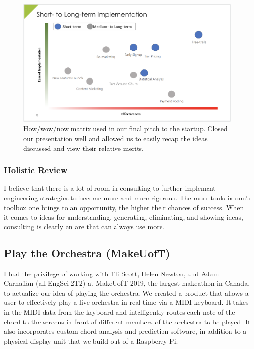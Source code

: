 \documentclass[a4paper,12pt]{article}
\begin{document}
\begin{figure}[H]
\centering
\includegraphics[width=1\textwidth]{img/image011.png}
\caption{How/wow/now matrix used in our final pitch to the startup. Closed our presentation well and allowed us to easily recap the ideas discussed and view their relative merits.}
\label{}
\end{figure}

\subsubsection{Holistic Review}
I believe that there is a lot of room in consulting to further implement engineering strategies to become more and more rigorous. The more tools in one’s toolbox one brings to an opportunity, the higher their chances of success. When it comes to ideas for understanding, generating, eliminating, and showing ideas, consulting is clearly an are that can always use more.

\subsection{Play the Orchestra (MakeUofT)}

I had the privilege of working with Eli Scott, Helen Newton, and Adam Carnaffan (all EngSci 2T2) at MakeUofT 2019, the largest makeathon in Canada, to actualize our idea of playing the orchestra. We created a product that allows a user to effectively play a live orchestra in real time via a MIDI keyboard. It takes in the MIDI data from the keyboard and intelligently routes each note of the chord to the screens in front of different members of the orchestra to be played. It also incorporates custom chord analysis and prediction software, in addition to a physical display unit that we build out of a Raspberry Pi. 
\end{document}

